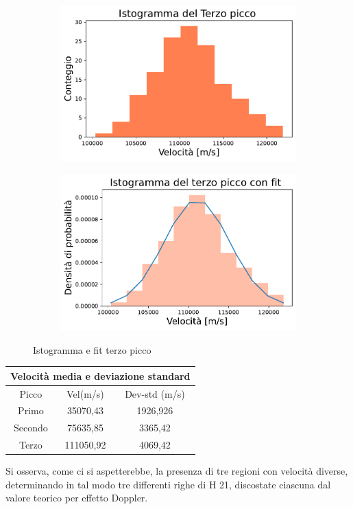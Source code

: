\begin{figure}[H]
\centering

\begin{subfigure}[h!]{0.49\textwidth}
	\includegraphics[width=\textwidth]{Terzo_histo.pdf}
    \label{fig:sub1}
\end{subfigure}
\hfill
\begin{subfigure}[h!]{0.49\textwidth}
    \includegraphics[width=\textwidth]{Terzo_histo_fit.pdf}
    \label{fig:sub2}
\end{subfigure}
\caption{Istogramma e fit terzo picco}
\end{figure}

\begin{table}[H]
\centering

\begin{tabular}{ |c|c|c|  }
	\hline
	\multicolumn{3}{|c|}{Velocità media e deviazione standard} \\
	\hline
	Picco & Vel(m/s)& Dev-std (m/s) \\
	\hline
	Primo &35070,43  & 1926,926    \\
	Secondo &75635,85  & 3365,42  \\
	Terzo &111050,92 &4069,42 \\

	\hline
\end{tabular}

\end{table}

Si osserva, come ci si aspetterebbe, la presenza di tre regioni con velocità diverse, determinando in tal modo tre differenti righe di H 21, discostate ciascuna dal valore teorico per effetto Doppler.



